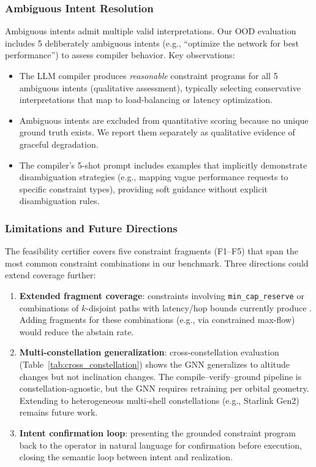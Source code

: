 \subsubsection{Ambiguous Intent Resolution}

Ambiguous intents admit multiple valid interpretations. Our OOD
evaluation includes 5 deliberately ambiguous intents (e.g., ``optimize
the network for best performance'') to assess compiler behavior.
Key observations:

\begin{itemize}
\item The LLM compiler produces \textit{reasonable} constraint programs
for all 5 ambiguous intents (qualitative assessment), typically selecting
conservative interpretations that map to load-balancing or latency
optimization.

\item Ambiguous intents are excluded from quantitative scoring because
no unique ground truth exists. We report them separately as qualitative
evidence of graceful degradation.

\item The compiler's 5-shot prompt includes examples that implicitly
demonstrate disambiguation strategies (e.g., mapping vague performance
requests to specific constraint types), providing soft guidance without
explicit disambiguation rules.
\end{itemize}

\subsubsection{Limitations and Future Directions}

The feasibility certifier covers five constraint fragments (F1--F5)
that span the most common constraint combinations in our benchmark.
Three directions could extend coverage further:

\begin{enumerate}
\item \textbf{Extended fragment coverage}: constraints involving
\texttt{min\_cap\_reserve} or combinations of $k$-disjoint paths
with latency/hop bounds currently produce . Adding
fragments for these combinations (e.g., via constrained max-flow)
would reduce the abstain rate.

\item \textbf{Multi-constellation generalization}: cross-constellation
evaluation (Table~\ref{tab:cross_constellation}) shows the GNN
generalizes to altitude changes but not inclination changes.
The compile--verify--ground pipeline is constellation-agnostic,
but the GNN requires retraining per orbital geometry. Extending
to heterogeneous multi-shell constellations (e.g., Starlink Gen2)
remains future work.

\item \textbf{Intent confirmation loop}: presenting the grounded
constraint program back to the operator in natural language for
confirmation before execution, closing the semantic loop between
intent and realization.
\end{enumerate}
